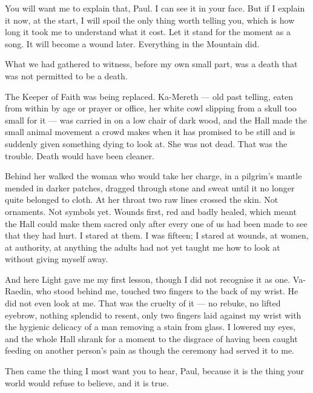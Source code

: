 You will want me to explain that, Paul. I can see it in your face. But if I explain it now, at the start, I will spoil the only thing worth telling you, which is how long it took me to understand what it cost. Let it stand for the moment as a song. It will become a wound later. Everything in the Mountain did.\par

\ornament

What we had gathered to witness, before my own small part, was a death that was not permitted to be a death.\par

The Keeper of Faith was being replaced. Ka-Mereth --- old past telling, eaten from within by age or prayer or office, her white cowl slipping from a skull too small for it --- was carried in on a low chair of dark wood, and the Hall made the small animal movement a crowd makes when it has promised to be still and is suddenly given something dying to look at. She was not dead. That was the trouble. Death would have been cleaner.\par

Behind her walked the woman who would take her charge, in a pilgrim's mantle mended in darker patches, dragged through stone and sweat until it no longer quite belonged to cloth. At her throat two raw lines crossed the skin. Not ornaments. Not symbols yet. Wounds first, red and badly healed, which meant the Hall could make them sacred only after every one of us had been made to see that they had hurt. I stared at them. I was fifteen; I stared at wounds, at women, at authority, at anything the adults had not yet taught me how to look at without giving myself away.\par

And here Light gave me my first lesson, though I did not recognise it as one. Va-Raedin, who stood behind me, touched two fingers to the back of my wrist. He did not even look at me. That was the cruelty of it --- no rebuke, no lifted eyebrow, nothing splendid to resent, only two fingers laid against my wrist with the hygienic delicacy of a man removing a stain from glass. I lowered my eyes, and the whole Hall shrank for a moment to the disgrace of having been caught feeding on another person's pain as though the ceremony had served it to me.\par

Then came the thing I most want you to hear, Paul, because it is the thing your world would refuse to believe, and it is true.\par

